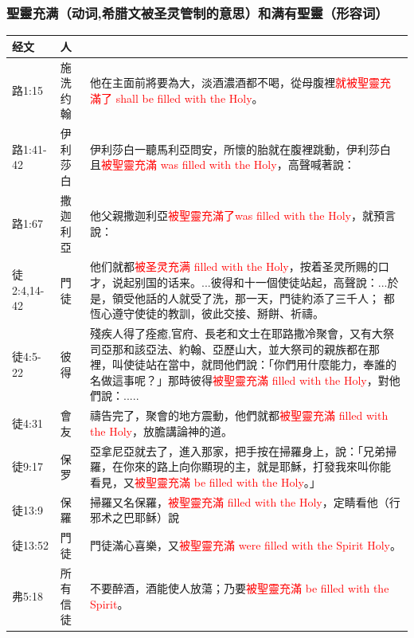 \subsubsection{聖靈充满（动词,希腊文被圣灵管制的意思）和满有聖靈（形容词）}
\begin{table}[H]
  \centering
  \begin{tabular}{p{5em}|p{5em}|p{38em}}  \toprule
经文 & 人 & \\  \midrule
路1:15&施洗约翰&他在主面前將要為大，淡酒濃酒都不喝，從母腹裡\textcolor{red}{就被聖靈充滿了 shall be filled with the Holy}。\\  \midrule
路1:41-42&伊利莎白&伊利莎白一聽馬利亞問安，所懷的胎就在腹裡跳動，伊利莎白且\textcolor{red}{被聖靈充滿 was filled with the Holy}，高聲喊著說：\\  \midrule
路1:67&撒迦利亞&他父親撒迦利亞\textcolor{red}{被聖靈充滿了was filled with the Holy}，就預言說：\\  \midrule
徒2:4,14-42&門徒&他们就都\textcolor{red}{被圣灵充满 filled with the Holy}，按着圣灵所赐的口才，说起别国的话来。...彼得和十一個使徒站起，高聲說：...於是，領受他話的人就受了洗，那一天，門徒約添了三千人； 都恆心遵守使徒的教訓，彼此交接、掰餅、祈禱。\\  \midrule
徒4:5-22&彼得&殘疾人得了痊癒,官府、長老和文士在耶路撒冷聚會，又有大祭司亞那和該亞法、約翰、亞歷山大，並大祭司的親族都在那裡，叫使徒站在當中，就問他們說：「你們用什麼能力，奉誰的名做這事呢？」那時彼得\textcolor{red}{被聖靈充滿 filled with the Holy}，對他們說：.....\\  \midrule
徒4:31&會友&禱告完了，聚會的地方震動，他們就都\textcolor{red}{被聖靈充滿 filled with the Holy}，放膽講論神的道。\\  \midrule
徒9:17&保罗&亞拿尼亞就去了，進入那家，把手按在掃羅身上，說：「兄弟掃羅，在你來的路上向你顯現的主，就是耶穌，打發我來叫你能看見，又\textcolor{red}{被聖靈充滿 be filled with the Holy}。」\\  \midrule
徒13:9&保羅&掃羅又名保羅，\textcolor{red}{被聖靈充滿 filled with the Holy}，定睛看他（行邪术之巴耶稣）說\\  \midrule
徒13:52&門徒&門徒滿心喜樂，又\textcolor{red}{被聖靈充滿 were filled with the Spirit Holy}。\\  \midrule
弗5:18&所有信徒&不要醉酒，酒能使人放蕩；乃要\textcolor{red}{被聖靈充滿 be filled with the Spirit}。\\  \midrule


\end{tabular}
\end{table}
